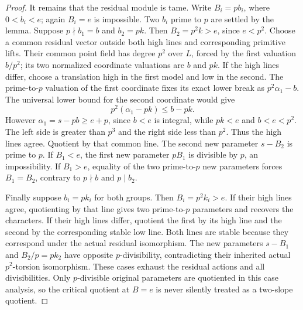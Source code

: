 \begin{proof}
It remains that the residual module is tame. Write \(B_i=pb_i\),
where \(0<b_i<e\); again \(B_i=e\) is impossible.
Two \(b_i\) prime to \(p\) are settled by the lemma.
Suppose \(p\nmid b_1=b\) and \(b_2=pk\).
Then \(B_2=p^2k>e\), since \(e<p^2\).
Choose a common residual vector outside both high lines and
corresponding primitive lifts. Their common point field has
degree \(p^2\) over \(L\), forced by the first valuation
\(b/p^2\); its two normalized coordinate valuations are
\(b\) and \(pk\). If the high lines differ, choose a translation
high in the first model and low in the second.
The prime-to-\(p\) valuation of the first coordinate fixes its
exact lower break as \(p^2\alpha_1-b\). The universal lower
bound for the second coordinate would give
\[
 p^2(\alpha_1-pk)\le b-pk .
 \tag{B-RD69.12}
\]
However \(\alpha_1=s-pb\ge e+p\), since \(b<e\) is integral,
while \(pk<e\) and \(b<e<p^2\). The left side is greater than
\(p^3\) and the right side less than \(p^2\). Thus the high
lines agree. Quotient by that common line.
The second new parameter \(s-B_2\) is prime to \(p\).
If \(B_1<e\), the first new parameter \(pB_1\) is divisible
by \(p\), an impossibility. If \(B_1>e\), equality of the two
prime-to-\(p\) new parameters forces \(B_1=B_2\), contrary
to \(p\nmid b\) and \(p\mid b_2\).

Finally suppose \(b_i=pk_i\) for both groups.
Then \(B_i=p^2k_i>e\). If their high lines agree, quotienting
by that line gives two prime-to-\(p\) parameters and recovers
the characters. If their high lines differ, quotient the
first by its high line and the second by the corresponding
stable low line. Both lines are stable because they correspond
under the actual residual isomorphism.
The new parameters \(s-B_1\) and \(B_2/p=pk_2\) have opposite
\(p\)-divisibility, contradicting their inherited actual
\(p^2\)-torsion isomorphism.
These cases exhaust the residual actions and all divisibilities.
Only \(p\)-divisible original parameters are quotiented in this
case analysis, so the critical quotient at \(B=e\) is never
silently treated as a two-slope quotient.
\end{proof}

